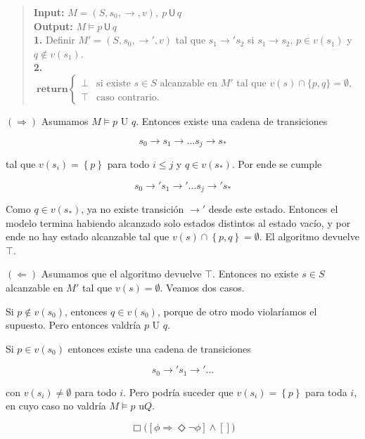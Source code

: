 \documentclass[a4paper, 12pt]{article}
\begin{document}
\small
\begin{quote}

\textbf{Input:} $M = (S, s_0, \to, v),\ p \,\mathsf{U}\, q$ \\[4pt]
\textbf{Output:} $M \models p \,\mathsf{U}\, q$ \\[6pt]

\textbf{1.} Definir $M' = (S, s_0, \to', v)$ tal que 
$s_1 \to' s_2$ si $s_1 \to s_2$, $p \in v(s_1)$ y $q \notin v(s_1)$. \\[6pt]

\textbf{2.}
\begin{equation*}
    \textbf{return}
\begin{cases}
\bot & \text{si existe } s \in S \text{ alcanzable en } M' \text{ tal que } v(s)\cap\{p,q\} = \emptyset,\\
\top & \text{caso contrario.}
\end{cases}
\end{equation*}

\end{quote}
\normalsize

$(\Rightarrow)$ Asumamos $M \vDash p \text{ U } q$. Entonces existe una cadena de transiciones 

\begin{equation*}
    s_0 \to s_1 \to \ldots s_j \to s_*
\end{equation*}

tal que $v(s_i) = \left\{ p \right\} $ para todo $i \leq j$ y $q \in v(s_*)$.
Por ende se cumple 

\begin{equation*}
    s_0 \to' s_1 \to' \ldots s_j \to' s_*
\end{equation*}

Como $q \in v(s_*)$, ya no existe  transición $\to'$ desde este estado. Entonces
el modelo termina habiendo alcanzado solo estados distintos al estado vacío, y
por ende no hay estado alcanzable tal que $v(s) \cap \left\{ p, q \right\} =
\emptyset$. El algoritmo devuelve $\top$.

$(\Leftarrow)$ Asumamos que el algoritmo devuelve $\top$. Entonces no existe $s
\in S$ alcanzable en $M'$ tal que $v(s) = \emptyset$. Veamos dos casos.

Si $p \not\in v(s_0)$, entonces $q \in v(s_0)$, porque de otro modo violaríamos
el supuesto. Pero entonces valdría $p \text{ U } q$.

Si $p \in v(s_0)$ entonces existe una cadena de transiciones 

\begin{equation*}
    s_0 \to' s_1 \to' \ldots 
\end{equation*}

con $v(s_i) \neq \emptyset $ para todo $i$. Pero podría suceder que $v(s_i) =
\left\{ p \right\} $ para toda $i$, en cuyo caso no valdría $M \vDash p \text{ u
} Q$.






\pagebreak 

\begin{equation*}
    \Box \Big( \left[ \phi \Rightarrow \Diamond \neg \phi \right]  \land  
        \left[  \right]  \Big)
\end{equation*}
\end{document}
